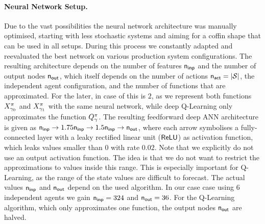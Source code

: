 \documentclass[envcountsame]{llncs}
\begin{document}
\paragraph*{Neural Network Setup.}
%
Due to the vast possibilities the neural network architecture was manually optimised, starting with
less stochastic systems and aiming for a coffin shape that can be used in all setups. During this
process we constantly adapted and reevaluated the best network on various production system
configurations. The resulting architecture depends on the number of features \(\mathsf{n_{inp}}\) and the
number of output nodes \(\mathsf{n_{out}}\), which itself depends on the number of actions
\(\mathsf{n_{act}} = \lvert{\mathcal{S}}\rvert\), the independent agent configuration, and the number of functions that
are approximated. For the later, in case of \ARA{} this is \(2\), as we represent both functions
\(X^\pi_{\gamma_{0}}\) and \(X^\pi_{\gamma_{1}}\) with the same neural network, while deep
Q-Learning only approximates the function \(Q_{\gamma}^\pi\).
%
The resulting feedforward deep ANN architecture is given as %
\(\anninp %
\rightarrow 1.75 \anninp %
\rightarrow 1.5 \anninp %
\rightarrow \annout %
\), where each arrow symbolises a fully-connected layer with a leaky rectified linear unit
(\(\mathsf{ReLU}\)) as activation function, which leaks values smaller than \(0\) with rate \(0.02\).
%
Note
that we explicitly do not use an output activation function. The idea is that we do not want to
restrict the approximations to values inside this range. This is especially important for
Q-Learning, as the range of the state values are difficult to forecast.
%
The actual values \(\mathsf{n_{inp}}\) and \(\mathsf{n_{out}}\) depend on the used algorithm. In our case case using 6
independent agents we gain \(\mathsf{n_{inp}}=324\) and \(\mathsf{n_{out}}=36\). For the Q-Learning algorithm, which
only approximates one function, the output nodes \(\mathsf{n_{out}}\) are halved.
%
%
\end{document}
